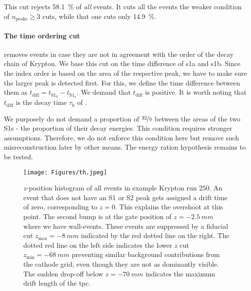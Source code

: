 This cut rejects \SI{58.1}{\%} of \emph{all} events. %
It cuts all the events the weaker condition of $ n_\mathrm{peaks} \ge 3 $ cuts, while that one cuts only \SI{14.9}{\%}.


\paragraph{The time ordering cut} removes events in case they are not in agreement with the order of the decay chain of Krypton.
We base this cut on the time difference of \gls{s1a} and \gls{s1b}.
Since the index order is based on the area of the respective peak, we have to make sure the larger peak is detected first.
For this, we define the time difference between them as $t_\mathrm{diff} = t_{\mathrm{S}1_\mathrm{b}} - t_{\mathrm{S}1_\mathrm{a}}$.
We demand that $t_\mathrm{diff}$ is positive.
It is worth noting that $t_\mathrm{diff}$ is the decay time $\tau_\mathrm{b}$ of . %

We purposely do not demand a proportion of $ \nicefrac{32}{9} $ between the areas of the two S1s - the proportion of their decay energies.
This condition requires stronger assumptions.
Therefore, we do not enforce this condition here but remove such misreconstruction later by other means.
The energy ration hypothesis remains to be tested.

\begin{figure}[H]
    \centering
    \texttt{[image: Figures/th.jpeg]}  %
    \caption[Fiducial z-cut]{$ z $-position histogram of all events in example Krypton run 250.
    An event that does not have an S1 or S2 peak gets assigned a drift time of zero, corresponding to $ z = 0 $.
    This explains the overshoot at this point.
    The second bump is at the gate position of $ z = \SI{-2.5}{mm}$ where we have wall-events.
    These events are suppressed by a fiducial cut $ z_\mathrm{max} = \SI{-8}{mm}$ indicated by the red dotted line on the right.
    The dotted red line on the left side indicates the lower $z$ cut $ z_\mathrm{min} = \SI{-68}{mm}$ preventing similar background contributions from the cathode grid,
    even though they are not as dominantly visible.
    The sudden drop-off below $ z = \SI{-70}{mm}$ indicates the maximum drift length of the \gls{tpc}.
    }
    \label{fig:fid-z-cut}
\end{figure}

